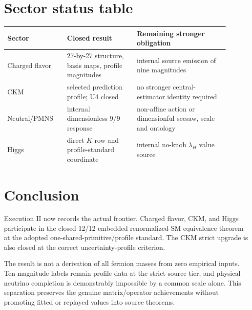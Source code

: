 \documentclass[11pt]{article}
\begin{document}
\section{Sector status table}

\begin{center}
\begin{tabular}{p{0.24\linewidth}p{0.29\linewidth}p{0.37\linewidth}}
\toprule
Sector & Closed result & Remaining stronger obligation \\
\midrule
Charged flavor & 27-by-27 structure, basis maps, profile magnitudes & internal
source emission of nine magnitudes \\
CKM & selected prediction profile; U4 closed & no stronger central-estimator
identity required \\
Neutral/PMNS & internal dimensionless 9/9 response & non-affine action or
dimensionful seesaw, scale and ontology \\
Higgs & direct $K$ row and profile-standard coordinate & internal no-knob
$\lambda_H$ value source \\
\bottomrule
\end{tabular}
\end{center}

\section{Conclusion}

Execution II now records the actual frontier. Charged flavor, CKM, and Higgs
participate in the closed 12/12 embedded renormalized-SM equivalence theorem at
the adopted one-shared-primitive/profile standard. The CKM strict upgrade is
also closed at the correct uncertainty-profile criterion.

The result is not a derivation of all fermion masses from zero empirical
inputs. Ten magnitude labels remain profile data at the strict source tier,
and physical neutrino completion is demonstrably impossible by a common scale
alone. This separation preserves the genuine matrix/operator achievements
without promoting fitted or replayed values into source theorems.
\end{document}
